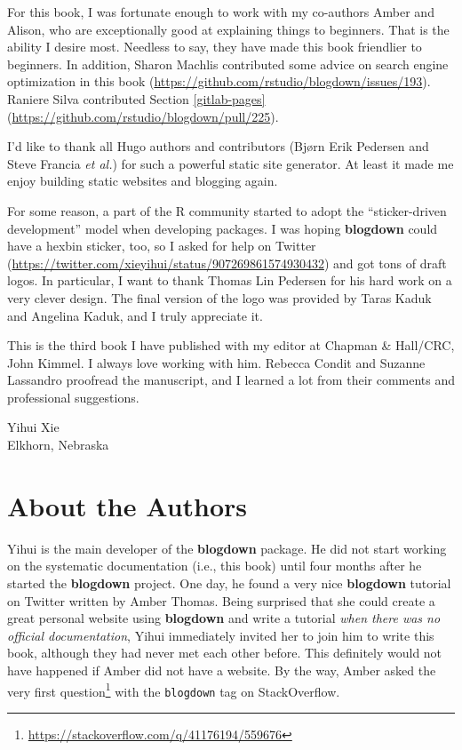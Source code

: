 \documentclass[12pt,]{krantz}
\renewcommand{\href}[2]{#2\footnote{\url{#1}}}
\theoremstyle{definition}
\theoremstyle{definition}
\theoremstyle{definition}
\theoremstyle{remark}
\let\BeginKnitrBlock\begin \let\EndKnitrBlock\end
\begin{document}
For this book, I was fortunate enough to work with my co-authors Amber
and Alison, who are exceptionally good at explaining things to
beginners. That is the ability I desire most. Needless to say, they have
made this book friendlier to beginners. In addition, Sharon Machlis
contributed some advice on search engine optimization in this book
(\url{https://github.com/rstudio/blogdown/issues/193}). Raniere Silva
contributed Section \ref{gitlab-pages}
(\url{https://github.com/rstudio/blogdown/pull/225}).

I'd like to thank all Hugo authors and contributors (Bjørn Erik Pedersen
and Steve Francia \emph{et al.}) for such a powerful static site
generator. At least it made me enjoy building static websites and
blogging again.

For some reason, a part of the R community started to adopt the
``sticker-driven development'' model when developing packages. I was
hoping \textbf{blogdown} could have a hexbin sticker, too, so I asked
for help on Twitter
(\url{https://twitter.com/xieyihui/status/907269861574930432}) and got
tons of draft logos. In particular, I want to thank Thomas Lin Pedersen
for his hard work on a very clever design. The final version of the logo
was provided by Taras Kaduk and Angelina Kaduk, and I truly appreciate
it.

This is the third book I have published with my editor at Chapman \&
Hall/CRC, John Kimmel. I always love working with him. Rebecca Condit
and Suzanne Lassandro proofread the manuscript, and I learned a lot from
their comments and professional suggestions.

\BeginKnitrBlock{flushright}
Yihui Xie\\
Elkhorn, Nebraska
\EndKnitrBlock{flushright}

\chapter*{About the Authors}\label{author}


Yihui is the main developer of the \textbf{blogdown} package. He did not
start working on the systematic documentation (i.e., this book) until
four months after he started the \textbf{blogdown} project. One day, he
found a very nice \textbf{blogdown} tutorial on Twitter written by Amber
Thomas. Being surprised that she could create a great personal website
using \textbf{blogdown} and write a tutorial \emph{when there was no
official documentation}, Yihui immediately invited her to join him to
write this book, although they had never met each other before. This
definitely would not have happened if Amber did not have a website. By
the way, Amber asked
\href{https://stackoverflow.com/q/41176194/559676}{the very first
question} with the \texttt{blogdown} tag on StackOverflow.
\end{document}
